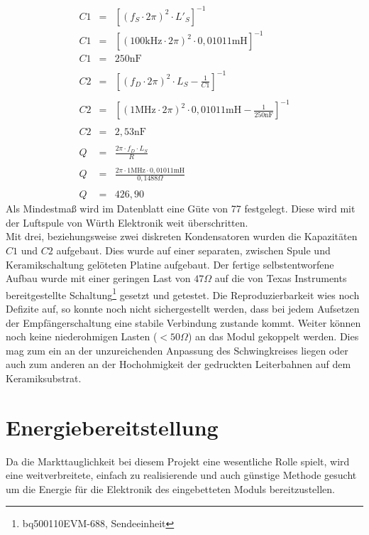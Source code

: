 \documentclass[12pt]{scrreprt} %
\begin{document}
\begin{eqnarray}
C1&=&\left[\left(f_S \cdot 2\pi\right)^2 \cdot L'_S\right]^{-1}\\
C1&=&\left[\left(100\text{kHz} \cdot 2\pi\right)^2 \cdot 0,01011\text{mH}\right]^{-1}\\
C1&=&250\text{nF}\\
\nonumber\\
C2&=&\left[\left(f_D \cdot 2\pi\right)^2 \cdot L_S-\frac 1{C1}\right]^{-1}\\
\nonumber\\
C2&=&\left[\left(1\text{MHz} \cdot 2\pi\right)^2 \cdot 0,01011\text{mH}-\frac 1{250\text{nF}}\right]^{-1}\\
\nonumber\\
C2&=&2,53\text{nF}\\
\nonumber\\
Q&=&\frac{2\pi \cdot f_D \cdot L_S}{R}\\
\nonumber\\
Q&=&\frac{2\pi \cdot 1\text{MHz} \cdot 0,01011\text{mH}}{0,1488 \Omega}\\
\nonumber\\
Q&=&426,90
\end{eqnarray}
Als Mindestmaß wird im Datenblatt \citep[siehe S.23]{BQ51013} eine Güte von 77 festgelegt. Diese wird mit der Luftspule von Würth Elektronik weit überschritten.\\
Mit drei, beziehungsweise zwei diskreten Kondensatoren wurden die Kapazitäten $C1$ und $C2$ aufgebaut. Dies wurde auf einer separaten, zwischen Spule und Keramikschaltung gelöteten Platine aufgebaut. Der fertige selbstentworfene Aufbau wurde mit einer geringen Last von $47 \Omega$ auf die von Texas Instruments bereitgestellte Schaltung\footnote{bq500110EVM-688, Sendeeinheit} gesetzt und getestet. Die Reproduzierbarkeit wies noch Defizite auf, so konnte noch nicht sichergestellt werden, dass bei jedem Aufsetzen der Empfängerschaltung eine stabile Verbindung zustande kommt. Weiter können noch keine niederohmigen Lasten ($<50 \Omega$) an das Modul gekoppelt werden. Dies mag zum ein an der unzureichenden Anpassung des Schwingkreises liegen oder auch zum anderen an der Hochohmigkeit der gedruckten Leiterbahnen auf dem Keramiksubstrat. 
\section{Energiebereitstellung}
\label{chap:4.2}
Da die Markttauglichkeit bei diesem Projekt eine wesentliche Rolle spielt, wird eine weitverbreitete, einfach zu realisierende und auch günstige Methode gesucht um die Energie für die Elektronik des eingebetteten Moduls bereitzustellen.
\end{document}
